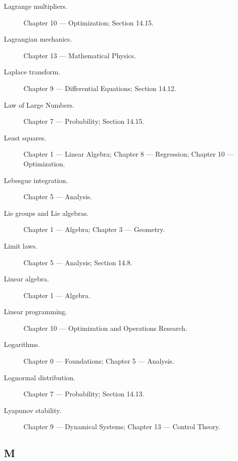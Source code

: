 \begin{description}

\item[Lagrange multipliers.]
Chapter 10 --- Optimization;
Section 14.15.

\item[Lagrangian mechanics.]
Chapter 13 --- Mathematical Physics.

\item[Laplace transform.]
Chapter 9 --- Differential Equations;
Section 14.12.

\item[Law of Large Numbers.]
Chapter 7 --- Probability;
Section 14.15.

\item[Least squares.]
Chapter 1 --- Linear Algebra;
Chapter 8 --- Regression;
Chapter 10 --- Optimization.

\item[Lebesgue integration.]
Chapter 5 --- Analysis.

\item[Lie groups and Lie algebras.]
Chapter 1 --- Algebra;
Chapter 3 --- Geometry.

\item[Limit laws.]
Chapter 5 --- Analysis;
Section 14.8.

\item[Linear algebra.]
Chapter 1 --- Algebra.

\item[Linear programming.]
Chapter 10 --- Optimization and Operations Research.

\item[Logarithms.]
Chapter 0 --- Foundations;
Chapter 5 --- Analysis.

\item[Lognormal distribution.]
Chapter 7 --- Probability;
Section 14.13.

\item[Lyapunov stability.]
Chapter 9 --- Dynamical Systems;
Chapter 13 --- Control Theory.

\end{description}

\subsection*{M}

